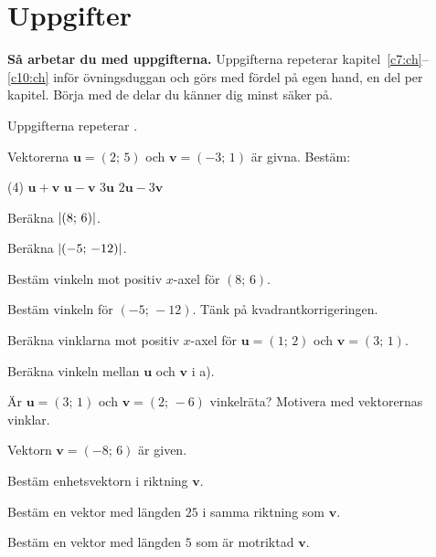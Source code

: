 
\section{Uppgifter}
\label{c11:sec:uppgifter}

\begin{aside}
\textbf{Så arbetar du med uppgifterna.} Uppgifterna repeterar kapitel~\ref{c7:ch}--\ref{c10:ch}
inför övningsduggan och görs med fördel på egen hand, en del per kapitel. Börja med de delar du
känner dig minst säker på.

\end{aside}

Uppgifterna repeterar .

Vektorerna $\mathbf{u} = (2;\,5)$ och $\mathbf{v} = (-3;\,1)$ är givna. Bestäm:
\begin{delar}(4)
  \task $\mathbf{u} + \mathbf{v}$
  \task $\mathbf{u} - \mathbf{v}$
  \task $3\mathbf{u}$
  \task $2\mathbf{u} - 3\mathbf{v}$
\end{delar}

\begin{parts}
  \item Beräkna $\lvert(8;\,6)\rvert$.
  \item Beräkna $\lvert(-5;\,-12)\rvert$.
  \item Bestäm vinkeln mot positiv $x$-axel för $(8;\,6)$.
  \item Bestäm vinkeln för $(-5;\,-12)$. Tänk på kvadrantkorrigeringen.
\end{parts}

\begin{parts}
  \item Beräkna vinklarna mot positiv $x$-axel för $\mathbf{u} = (1;\,2)$ och
    $\mathbf{v} = (3;\,1)$.
  \item Beräkna vinkeln mellan $\mathbf{u}$ och $\mathbf{v}$ i a).
  \item Är $\mathbf{u} = (3;\,1)$ och $\mathbf{v} = (2;\,-6)$ vinkelräta? Motivera med vektorernas
    vinklar.
\end{parts}

Vektorn $\mathbf{v} = (-8;\,6)$ är given.
\begin{parts}
  \item Bestäm enhetsvektorn i riktning $\mathbf{v}$.
  \item Bestäm en vektor med längden $25$ i samma riktning som $\mathbf{v}$.
  \item Bestäm en vektor med längden $5$ som är motriktad $\mathbf{v}$.
\end{parts}

